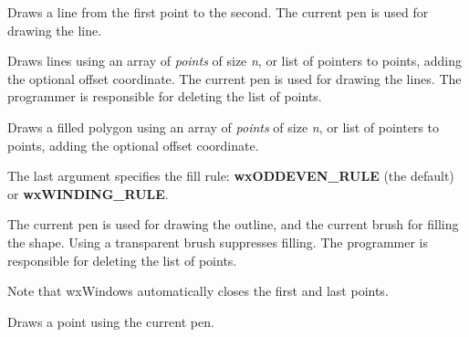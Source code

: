 Draws a line from the first point to the second. The current pen is used
for drawing the line.

\label{wxdcdrawlines}



Draws lines using an array of {\it points} of size {\it n}, or list of
pointers to points, adding the optional offset coordinate. The current
pen is used for drawing the lines.  The programmer is responsible for
deleting the list of points.

\label{wxdcdrawpolygon}



Draws a filled polygon using an array of {\it points} of size {\it n},
or list of pointers to points, adding the optional offset coordinate.

The last argument specifies the fill rule: {\bf wxODDEVEN\_RULE} (the
default) or {\bf wxWINDING\_RULE}.

The current pen is used for drawing the outline, and the current brush
for filling the shape.  Using a transparent brush suppresses filling.
The programmer is responsible for deleting the list of points.

Note that wxWindows automatically closes the first and last points.


\label{wxdcdrawpoint}


Draws a point using the current pen.

\label{wxdcdrawrectangle}


